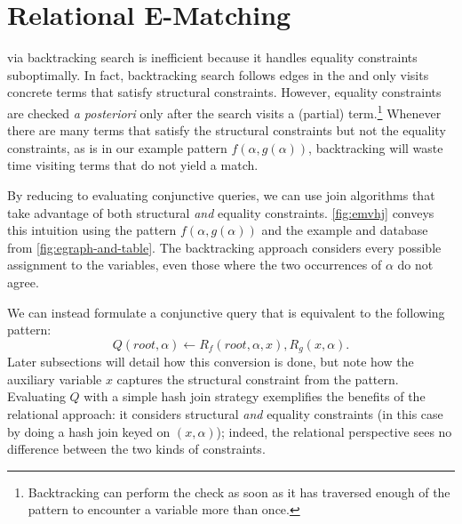 \section{Relational E-Matching}
\label{sec:algorithm}


\Ematching via
 backtracking search is inefficient because it handles equality constraints
 suboptimally.
In fact, backtracking search follows edges in the \egraph and only
 visits concrete terms that satisfy structural constraints.
However, equality constraints
 are checked \emph{a posteriori} only after the search visits a (partial) term.\footnote{
   Backtracking \ematching can perform the check as soon as it has traversed
   enough of the pattern to encounter a variable more than once.
}
Whenever there are many
 terms that satisfy the structural constraints but not the equality constraints,
 as is in our example pattern $f(\alpha, g(\alpha))$,
 backtracking will waste time visiting terms that do not yield a match.

By reducing \ematching to evaluating conjunctive queries,
 we can use join algorithms that take advantage of both structural
 \emph{and} equality constraints.
\autoref{fig:emvhj} conveys this intuition
 using the pattern $f(\alpha, g(\alpha))$ and the
 example \egraph and database from \autoref{fig:egraph-and-table}.
The backtracking approach considers every possible assignment
 to the variables, even those where the two occurrences of $\alpha$
 do not agree.

We can instead formulate a conjunctive query
 that is equivalent to the following pattern:
 $$Q(root, \alpha) \gets R_f(root, \alpha, x), R_g(x, \alpha).$$
Later subsections will detail how this conversion is done,
 but note how the auxiliary variable $x$ captures the structural
 constraint from the pattern.
Evaluating $Q$ with a simple hash join strategy exemplifies the
 benefits of the relational approach:
 it considers structural \emph{and} equality constraints
 (in this case by doing a hash join keyed on $(x, \alpha)$);
 indeed, the relational perspective sees
 no difference between the two kinds of constraints.

